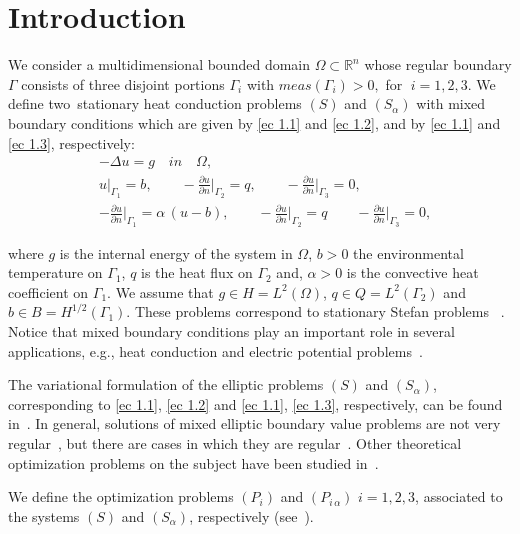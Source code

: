 \documentclass[axioms,article,submit,moreauthors]{Definitions/mdpi}
\begin{document}
\section{Introduction}\label{intro}

   We consider a multidimensional bounded domain $\Omega \subset \mathbb{R}^n$ whose regular boundary $\Gamma$  consists of three disjoint portions $\Gamma_i$ with $meas(\Gamma_i) > 0,$ for   $\; i=1, 2, 3$. We define two~stationary heat conduction problems  $(S)$ and $(S_\alpha)$ with mixed boundary conditions which are given by  \eqref{ec 1.1} and \eqref{ec 1.2}, and by \eqref{ec 1.1} and \eqref{ec 1.3}, respectively: 
 \begin{align}
 & -\Delta u=g   \quad in \quad  \Omega, \label{ec 1.1}\\[0.25cm]
 & u\Big\vert_{\Gamma_1}=b,\qquad -\tfrac{\partial u}{\partial n}\Big\vert_{\Gamma_2} =q , \qquad -\tfrac{\partial u}{\partial n} \Big\vert_{\Gamma_3}=0, \label{ec 1.2}\\[0.25cm]
 & -\tfrac{\partial u}{\partial n} \Big\vert_{\Gamma_1}= \alpha\,(u-b),\qquad -\tfrac{\partial u}{\partial n} \Big\vert_{\Gamma_2}=q \qquad -\tfrac{\partial u}{\partial n}\Big\vert_{\Gamma_3} =0 ,\label{ec 1.3}
\end{align}   
 
\noindent where $g$ is the internal energy of the system in $\Omega$, $b>0$ the environmental temperature  on $\Gamma_1$, $q$ is the heat flux on $\Gamma_2$ and, $\alpha>0$ is the convective heat coefficient on $\Gamma_1.$ We assume that $g \in H= L^2(\Omega)$, $q\in Q=L^2(\Gamma_2)$ and $b \in B= H^{1/2}(\Gamma_1).$  These problems correspond to stationary Stefan problems ~\cite{TaTa1989,Ta1996}.
   Notice that mixed boundary conditions play an important role in several applications, e.g., heat conduction and electric potential problems~\cite{HaMe2009}. 

  
The variational formulation of the  elliptic problems {$(S)$ and $(S_\alpha)$, corresponding to} \eqref{ec 1.1}, \eqref{ec 1.2} and \eqref{ec 1.1}, \eqref{ec 1.3}, {respectively,} can be found  in~\cite{GaTa2003,GaTa2008,TaTa1989}. In general,  solutions of mixed elliptic boundary value problems {are not very} regular~\cite{Gr1985}, but there are cases in which they are regular~\cite{AzKr1982,LaCaBr2008,Sh1968}. Other theoretical optimization problems on the subject have been {studied} in~\cite{Hi2005,WaWa2011}. 
 
We define the optimization problems $(P_i)$ and $(P_{i\,\alpha})$ $i=1,2,3$, associated to the systems $(S)$ and $(S_\alpha)$, respectively (see~\cite{Ba1984,GaTa2003,Li1968,NeSpTi2006,Tr2010}). 
\end{document}
